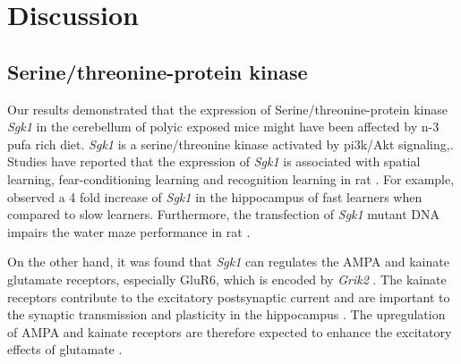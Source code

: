 %	

\section{Discussion}
\subsection{Serine/threonine-protein kinase}
Our results demonstrated that the expression of Serine/threonine-protein kinase \textit{Sgk1} in the cerebellum of \gls{polyic} exposed mice might have been affected by n-3 \gls{pufa} rich diet.
\textit{Sgk1} is a serine/threonine kinase activated by \gls{pi3k}/Akt signaling,.
Studies have reported that the expression of \textit{Sgk1} is associated with spatial learning, fear-conditioning learning and recognition learning in rat \citep{Tsai2002,Lee2003}.
For example, \citet{Tsai2002} observed a 4 fold increase of \textit{Sgk1} in the hippocampus of fast learners when compared to slow learners.
Furthermore, the transfection of \textit{Sgk1} mutant DNA impairs the water maze performance in rat \citep{Tsai2002}.

On the other hand, it was found that \textit{Sgk1} can regulates the AMPA and kainate glutamate receptors, especially GluR6, which is encoded by \textit{Grik2} \citep{Lang2006,Lang2010}.
The kainate receptors contribute to the excitatory postsynaptic current and are important to the synaptic transmission and plasticity in the hippocampus \citep{Lang2006}.
The upregulation of AMPA and kainate receptors are therefore expected to enhance the excitatory effects of glutamate \citep{Lang2010}.

